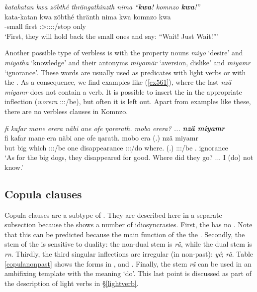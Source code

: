 \begin{exe}
 	\ex \emph{katakatan kwa zöbthé thrängathinzth nima ``\textbf{kwa}! komnzo \textbf{kwa}!''}\\
 	\gll kata-katan kwa zöbthé thränth nima kwa komnzo kwa\\
	\Redup-small \Fut{} first \Stpl:\Sbj>\Stpl:\Obj:\Irr:\Pfv:\Venit/stop \Quot{} \Fut{} only \Fut{}\\
 	\trans `First, they will hold back the small ones and say: ``Wait! Just Wait!'''\\
 	\label{ex560}
\end{exe}

Another possible type of verbless  is with the property nouns \emph{miyo} `desire' and \emph{miyatha} `knowledge' and their antonyms \emph{miyomär} `aversion, dislike' and \emph{miyamr} `ignorance'. These words are usually used as  predicates with light verbs or with the . As a consequence, we find examples like ({\ref{ex561}}), where the last  \emph{nzä miyamr} does not contain a verb. It is possible to insert the  in the appropriate inflection (\emph{worera} \Fsg:\Sbj:\Pst:\Ipfv/be), but often it is left out. Apart from examples like these, there are no verbless clauses in Komnzo.

\begin{exe}
	\ex \emph{fi kafar mane erera näbi ane ofe ŋarerath. mobo erera? ... \textbf{nzä miyamr}}\\
	\gll fi kafar mane era näbi ane ofe ŋarath. mobo era (.) nzä miyamr\\
	but big which \Stpl:\Sbj:\Pst:\Ipfv/be one \Dem{} disappearance \Stpl:\Sbj:\Pst:\Ipfv/do where.\All{} (.)  \Stpl:\Sbj:\Pst:\Ipfv/be \Fsg.\Abs{} ignorance\\
	\trans `As for the big dogs, they disappeared for good. Where did they go? ... I (do) not know.'
	\label{ex561}
\end{exe}

\subsection{Copula clauses}\label{copclause}

Copula clauses are a subtype of  . They are described here in a separate subsection because the  shows a number of idiosyncrasies. First, the  has no . Note that this can be predicted because the main function of the  the  . Secondly, the stem of the  is sensitive to duality: the non-dual stem is \emph{rä}, while the dual stem is \emph{rn}. Thirdly, the third  singular inflections are irregular (in non-past):  \emph{yé};  \emph{rä}. Table \ref{copulanonpast} shows the  forms in ,  and  . Finally, the  stem \emph{rä} can be used in an ambifixing template with the meaning `do'. This last point is discussed as part of the description of light verbs in \S\ref{lightverb}.

